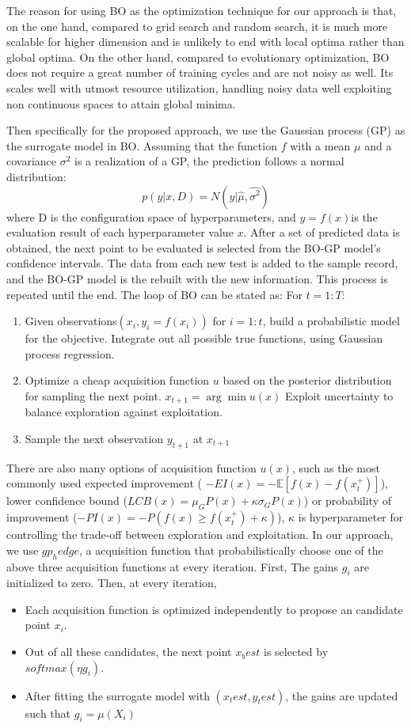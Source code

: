 \documentclass[review]{elsarticle}
\begin{document}
The reason for using BO as the optimization technique for our approach is that, on the one hand, compared to grid search and random search, it is much more scalable for higher dimension and is unlikely to end with local optima rather than global optima. On the other hand, compared to evolutionary optimization, BO does not require a great number of training cycles and are not noisy as well. Its scales well with utmost resource utilization, handling noisy data well exploiting non continuous spaces to attain global minima.

Then specifically for the proposed approach, we use the Gaussian process (GP) as the surrogate model in BO. Assuming that the function $ f $ with a mean $ \mu $ and a covariance $\sigma^2$ is a realization of a GP, the prediction follows a normal distribution:
\begin{equation}\label{eq3}
	p(y|x,D)=N(y|\hat{\mu},\hat{\sigma^2})
\end{equation}where D is the configuration space of hyperparameters, and $y=f(x)$is the evaluation result of each hyperparameter value $ x $. After a set of predicted data is obtained, the next point to be evaluated is selected from the BO-GP model's confidence intervals. The data from each new test is added to the sample record, and the BO-GP model is the rebuilt with the new information. This process is repeated until the end.
The loop of BO can be stated as:
For $ t=1:T $:
\begin{enumerate}
	\item Given observations$ (x_i,y_i=f(x_i))$ for $i=1:t$, build a probabilistic model for the objective. Integrate out all possible true functions, using Gaussian process regression.
	\item Optimize a cheap acquisition function $ u $ based on the posterior distribution for sampling the next point. $ x_{t+1}=\arg\min u(x)$ Exploit uncertainty to balance exploration against exploitation.
	\item Sample the next observation $y_{t+1}$ at $x_{t+1}$
\end{enumerate}

There are also many options of acquisition function $ u(x) $, such as the most commonly used expected improvement ( $ -EI(x)=-\mathbb{E}[f(x)-f(x_t^+)]$), lower confidence bound ($LCB(x)=\mu_GP(x)+\kappa\sigma_GP(x)$) or probability of improvement ($ -PI(x)=-P(f(x)\geq f(x_t^+)+\kappa)$), $\kappa$ is hyperparameter for controlling the trade-off between exploration and exploitation. In our approach, we use $gp_hedge$, a acquisition function that probabilistically choose one of the above three acquisition functions at every iteration. First, The gains $ g_i $ are initialized to zero. Then, at every iteration,
\begin{itemize}
	\item Each acquisition function is optimized independently to propose an candidate point $x_i$.
	\item Out of all these candidates, the next point $x_best$ is selected by $softmax(\eta g_i)$.
	\item After fitting the surrogate model with $(x_test,y_test)$, the gains are updated such that $g_i=\mu(X_i)$
\end{itemize}
\end{document}
